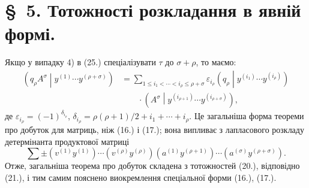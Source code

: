 \documentclass[11pt]{article}
\newcommand{\pair}[2]{\left(#1\middle|#2\right)}
\newcommand{\eps}{\varepsilon}
\begin{document}
\section*{\S\ 5. Тотожності розкладання в явній формі.}

Якщо у випадку 4) в (25.) спеціалізувати $\tau$ до $\sigma+\rho$, то маємо:
\begin{equation}
\begin{aligned}
 \pair{q_\rho A^\sigma}{y^{(1)}\cdots y^{(\rho+\sigma)}}
 &=\sum_{1\le i_1<\cdots<i_\rho\le \rho+\sigma}
 \eps_{i_\rho}\pair{q_\rho}{y^{(i_1)}\cdots y^{(i_\rho)}}\\
 &\qquad\cdot
 \pair{A^\sigma}{y^{(i_{\rho+1})}\cdots y^{(i_{\rho+\sigma})}},
\end{aligned}
\tag{32}
\end{equation}
де $\eps_{i_\rho}=(-1)^{\delta_{i_\rho}}$, $\delta_{i_\rho}=\rho(\rho+1)/2+i_1+\cdots+i_\rho$. Це загальніша форма теореми про добуток для матриць, ніж (16.) і (17.); вона випливає з лапласового розкладу детермінанта продуктової матриці
\[
 \sum\pm(v^{(1)}y^{(1)})\cdots(v^{(\rho)}y^{(\rho)})
 (a^{(1)}y^{(\rho+1)})\cdots(a^{(\sigma)}y^{(\rho+\sigma)}).
\]
Отже, загальніша теорема про добуток складена з тотожностей (20.), відповідно (21.), і тим самим пояснено виокремлення спеціальної форми (16.), (17.).
\end{document}
